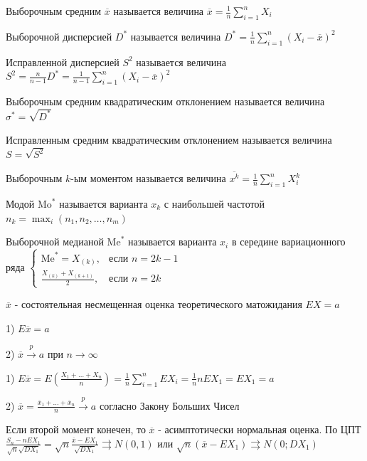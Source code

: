 \documentclass[12pt]{article}
\begin{document}
\Def Выборочным средним $\overline{x}$ называется величина $\overline{x} = \frac{1}{n} \sum_{i = 1}^n X_i$

\Defs Выборочной дисперсией $D^*$ называется величина $D^* = \frac{1}{n} \sum_{i = 1}^n (X_i - \overline{x})^2$

\Defs Исправленной дисперсией $S^2$ называется величина $S^2 = \frac{n}{n - 1} D^* = \frac{1}{n - 1} \sum_{i = 1}^n (X_i - \overline{x})^2$

\Defs Выборочным средним квадратическим отклонением называется величина $\sigma^* = \sqrt{D^*}$

\Defs Исправленным средним квадратическим отклонением называется величина $S = \sqrt{S^2}$

\Defs Выборочным $k$-ым моментом называется величина $\overline{x^k} = \frac{1}{n} \sum_{i = 1}^n X_i^k$

\Defs Модой $\mathrm{Mo}^*$ называется варианта $x_k$ с наибольшей частотой $n_k = \max_i (n_1, n_2, \dots, n_m)$

\Defs Выборочной медианой $\mathrm{Me}^*$ называется варианта $x_i$ в середине вариационного ряда $\begin{cases}\mathrm{Me}^* = 
X_{(k)}, & \text{если } n = 2k - 1 \\ \frac{X_{(k)} + X_{(k + 1)}}{2}, & \text{если } n = 2k\end{cases}$

\begin{MyTheorem}
    \Ths $\overline{x}$ - состоятельная несмещенная оценка теоретического матожидания $EX = a$

    1) $E \overline{x} = a$

    2) $\overline{x} \overset{p}{\longrightarrow} a$ при $n \to \infty$
\end{MyTheorem}

\begin{MyProof}
    1) $E \overline{x} = E\left(\frac{X_1 + \dots + X_n}{n}\right) = \frac{1}{n} \sum_{i = 1}^n E X_i = 
    \frac{1}{n} n E X_1 = E X_1 = a$

    2) $\overline{x} = \frac{\overline{x}_1 + \dots + \overline{x}_n}{n} \overset{p}{\longrightarrow} a$ 
    согласно Закону Больших Чисел
\end{MyProof}

\Nota Если второй момент конечен, то $\overline{x}$ - асимптотически нормальная оценка. По ЦПТ $\frac{S_n - n E X_1}{\sqrt{n} \sqrt{D X_1}} = \sqrt{n} \frac{\overline{x} - E X_1}{\sqrt{D X_1}} \rightrightarrows N(0, 1)$
или $\sqrt{n} (\overline{x} - E X_1) \rightrightarrows N(0; D X_1)$
\end{document}
